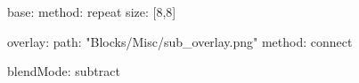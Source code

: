 base:
  method: repeat
  size: [8,8]

overlay:
  path: "Blocks/Misc/sub_overlay.png"
  method: connect

blendMode: subtract